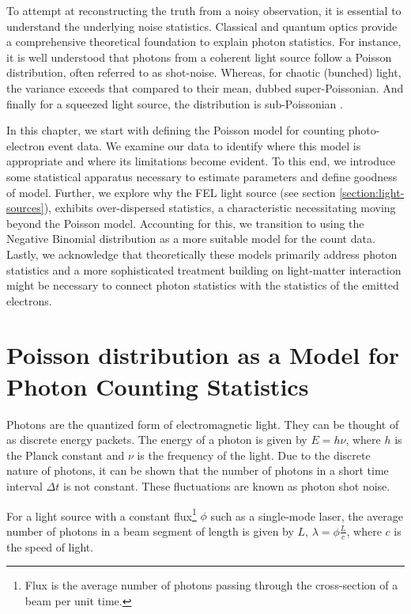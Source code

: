 To attempt at reconstructing the truth from a noisy observation, it is essential to understand the underlying noise statistics. Classical and quantum optics provide a comprehensive theoretical foundation to explain photon statistics. For instance, it is well understood that photons from a coherent light source follow a Poisson distribution, often referred to as shot-noise. Whereas, for chaotic (bunched) light, the variance exceeds that compared to their mean, dubbed super-Poissonian. And finally for a squeezed light source, the distribution is sub-Poissonian \cite[Chapter~5]{foxQuantumOpticsIntroduction2006}.

In this chapter, we start with defining the Poisson model for counting photo-electron event data. We examine our data to identify where this model is appropriate and where its limitations become evident. To this end, we introduce some statistical apparatus necessary to estimate parameters and define goodness of model. Further, we explore why the \gls{FEL} light source (see section \ref{section:light-sources}), exhibits over-dispersed statistics, a characteristic necessitating moving beyond the Poisson model. Accounting for this, we transition to using the Negative Binomial distribution as a more suitable model for the count data. Lastly, we acknowledge that theoretically these models primarily address photon statistics and a more sophisticated treatment building on light-matter interaction might be necessary to connect photon statistics with the statistics of the emitted electrons.


\section{Poisson distribution as a Model for Photon Counting Statistics}\label{section:photon-counting-stats}

Photons are the quantized form of electromagnetic light. They can be thought of as discrete energy packets. The energy of a photon is given by $E = h\nu$, where $h$ is the Planck constant and $\nu$ is the frequency of the light. Due to the discrete nature of photons, it can be shown that the number of photons in a short time interval $\Delta t$ is not constant. These fluctuations are known as photon shot noise.

For a light source with a constant flux\footnote{Flux is the average number of photons passing through the cross-section of a beam per unit time.} $\phi$ such as a single-mode laser, the average number of photons in a beam segment of length is given by $L$, $\lambda = \phi \frac{L}{c}$, where $c$ is the speed of light.

